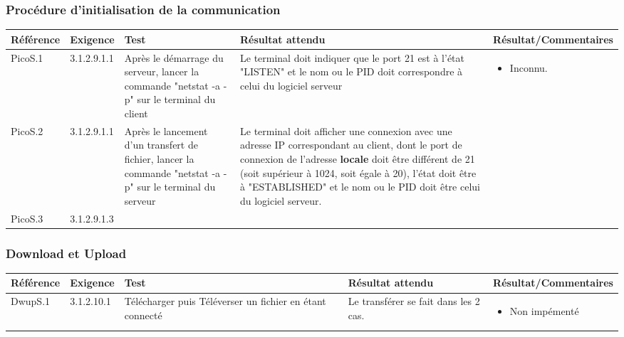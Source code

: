 \documentclass[10pt,a4paper,landscape]{report}
\begin{document}
\subsubsection{Procédure d’initialisation de la communication}
\begin{center}
	\bgroup
	\def\arraystretch{1.5}
	\begin{tabular}{|p{2.5cm}|p{2cm}|p{8cm}|p{8cm}|p{5cm}|}
		\hline
		\rowcolor{gris}Référence & Exigence & Test & Résultat attendu & Résultat/Commentaires\\
		\hline
		PicoS.1 & 3.1.2.9.1.1 & Après le démarrage du serveur, lancer la commande "netstat -a -p" sur le terminal du client & Le terminal doit indiquer que le port 21 est à l'état "LISTEN" et le nom ou le PID doit correspondre à celui du logiciel serveur &\vspace*{-0.2cm} \begin{itemize}[label=$\ast$] \item \textcolor{ukwn}{Inconnu.}\end{itemize} \\
		\hline
		PicoS.2 & 3.1.2.9.1.1 & Après le lancement d'un transfert de fichier, lancer la commande "netstat -a -p" sur le terminal du serveur & Le terminal doit afficher une connexion avec une adresse IP correspondant au client, dont le port de connexion de l'adresse \textbf{locale} doit être différent de 21 (soit supérieur à 1024, soit égale à 20), l'état doit être à "ESTABLISHED" et le nom ou le PID doit être celui du logiciel serveur.&\\
		\cline{1-2}
		PicoS.3 & 3.1.2.9.1.3 & & &\\
		\hline
	\end{tabular}
	\egroup
\end{center}

\subsubsection{Download et Upload}
\begin{center}
	\bgroup
	\def\arraystretch{1.5}
	\begin{tabular}{|p{2.5cm}|p{2cm}|p{8cm}|p{8cm}|p{5cm}|}
		\hline
		\rowcolor{gris}Référence & Exigence & Test & Résultat attendu & Résultat/Commentaires\\
		\hline
		DwupS.1 & 3.1.2.10.1 & Télécharger puis Téléverser un fichier en étant connecté & Le transférer se fait dans les 2 cas. &\vspace*{-0.2cm} \begin{itemize}[label=$\ast$] \item \textcolor{false}{Non impémenté}\end{itemize}
\\
		\hline
	\end{tabular}
	\egroup
\end{center}
\end{document}
